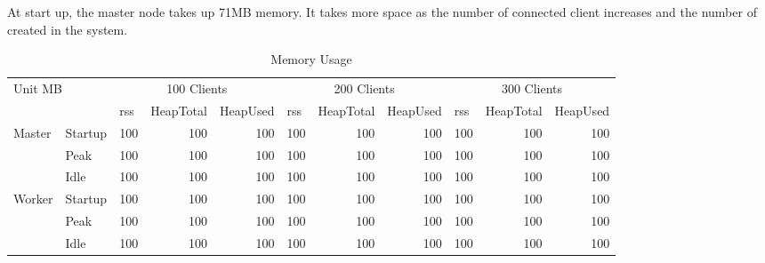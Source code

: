 At start up, the master node takes up 71MB memory.
It takes more space as the number of connected client increases and the number
of \appins{} created in the system.


\begin{table}[h]
\begin{tabular}{|l|l|r|r|r|r|r|r|r|r|r|}
\hline
\multicolumn{2}{|l|}{\multirow{2}{*}{Unit MB}} & \multicolumn{3}{c|}{100 Clients} & \multicolumn{3}{c|}{200 Clients} & \multicolumn{3}{c|}{300 Clients} \\ \cline{3-11} 
\multicolumn{2}{|l|}{} & \multicolumn{1}{l|}{rss} & \multicolumn{1}{l|}{HeapTotal} & \multicolumn{1}{l|}{HeapUsed} & \multicolumn{1}{l|}{rss} & \multicolumn{1}{l|}{HeapTotal} & \multicolumn{1}{l|}{HeapUsed} & \multicolumn{1}{l|}{rss} & \multicolumn{1}{l|}{HeapTotal} & \multicolumn{1}{l|}{HeapUsed} \\ \hline
\multirow{3}{*}{Master} & Startup & 100 & 100 & 100 & 100 & 100 & 100 & 100 & 100 & 100 \\ \cline{2-11} 
 & Peak & 100 & 100 & 100 & 100 & 100 & 100 & 100 & 100 & 100 \\ \cline{2-11} 
 & Idle & 100 & 100 & 100 & 100 & 100 & 100 & 100 & 100 & 100 \\ \hline
\multirow{3}{*}{Worker} & Startup & 100 & 100 & 100 & 100 & 100 & 100 & 100 & 100 & 100 \\ \cline{2-11} 
 & Peak & 100 & 100 & 100 & 100 & 100 & 100 & 100 & 100 & 100 \\ \cline{2-11} 
 & Idle & 100 & 100 & 100 & 100 & 100 & 100 & 100 & 100 & 100 \\ \hline
\end{tabular}
\caption{Memory Usage}
\label{tbl:mem}
\end{table}
